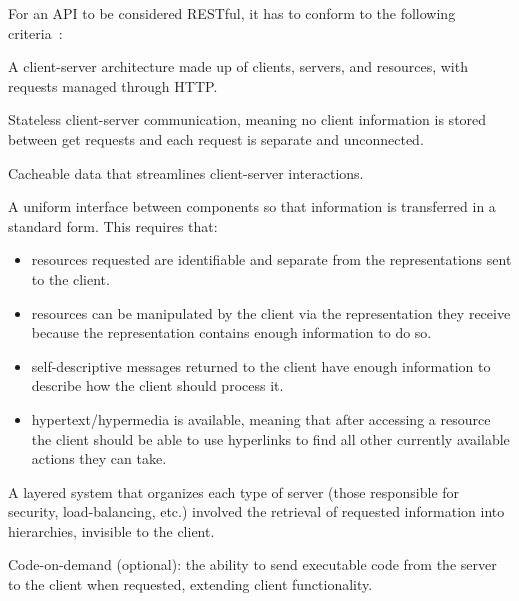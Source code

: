 For an API to be considered RESTful, it has to conform to the following
criteria~\cite{whatsRestApi}:
\begin{item-c}
\item A client-server architecture made up of clients, servers, and resources,
  with requests managed through HTTP.
\item Stateless client-server communication, meaning no client information is
  stored between get requests and each request is separate and unconnected.
\item Cacheable data that streamlines client-server interactions.
\item A uniform interface between components so that information is transferred
  in a standard form. This requires that:
  \begin{itemize}
    \item resources requested are identifiable and separate from the
      representations sent to the client.
    \item resources can be manipulated by the client via the representation they
      receive because the representation contains enough information to do so.
    \item self-descriptive messages returned to the client have enough
      information to describe how the client should process it.
    \item hypertext/hypermedia is available, meaning that after accessing a
      resource the client should be able to use hyperlinks to find all other
      currently available actions they can take.
  \end{itemize}
\item A layered system that organizes each type of server (those responsible for
  security, load-balancing, etc.) involved the retrieval of requested
  information into hierarchies, invisible to the client.
\item Code-on-demand (optional): the ability to send executable code from the
  server to the client when requested, extending client functionality.
\end{item-c}

